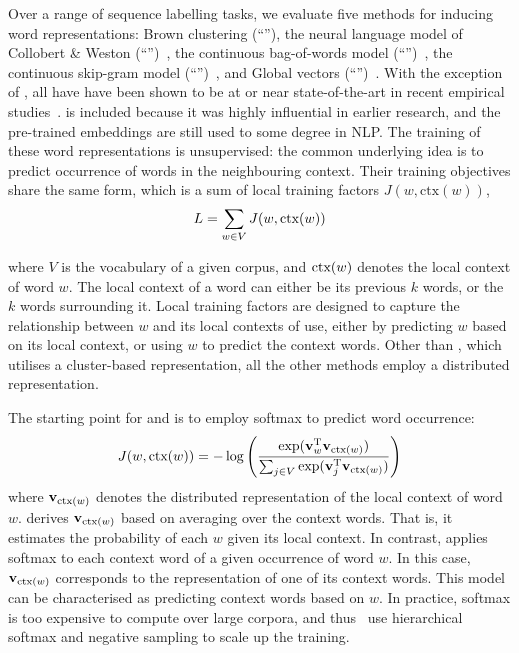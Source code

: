 Over a range of sequence labelling tasks, we evaluate five methods for
inducing word representations: Brown clustering
\cite{Brown92class-basedn-gram} (``\brown''), the neural language model
of Collobert \& Weston (``\CW'')~\cite{collobert2011natural}, the
continuous bag-of-words model (``\CBOW'')~\cite{Mikolov13}, the continuous
skip-gram model (``\Skipgram'')~\cite{Mikolov13NIPS}, and Global vectors
(``\Glove'')~\cite{pennington2014glove}. With the exception of \CW, all have
have been shown to be at or near state-of-the-art in recent empirical
studies~\cite{turian2010word,pennington2014glove}. \CW is included
because it was highly influential in earlier research, and the pre-trained embeddings are
still used to some degree in NLP. The training of these word
representations is unsupervised: the common underlying idea is to
predict occurrence of words in the neighbouring context. Their training
objectives share the same form, which is a sum of local training factors
$J(w, \text{ctx}(w))$,  
\begin{displaymath}
  L = \sum_{w \in V} J(w, \text{ctx}(w))
\end{displaymath}

where $V$ is the vocabulary of a given corpus, and $\text{ctx}(w)$ denotes the
local context of word $w$.
The local context of a word can either be its previous $k$ words, or the
$k$ words surrounding it. 
Local training factors are designed to capture the relationship between
$w$ and its local contexts of use, either by predicting $w$
based on its local context, or using $w$ to predict the
context words. Other than \brown, which utilises a cluster-based
representation, all the other methods employ a distributed representation.

The starting point for \CBOW and \Skipgram is to employ softmax to predict word occurrence:
\begin{displaymath}
  J(w, \text{ctx}(w)) = - \log \left( \frac{\exp(\mathbf{v}_w^{\text{T}} \mathbf{v}_{\text{ctx}(w)})}{ \sum_{j \in V} \exp(\mathbf{v}_j^{\text{T}} \mathbf{v}_{\text{ctx}(w)})} \right)
\end{displaymath}
where $\mathbf{v}_{\text{ctx}(w)}$ denotes the distributed representation of
the local context of word $w$. \CBOW derives $\mathbf{v}_{\text{ctx}(w)}$
based on averaging over the context words. That is, it estimates the
probability of each $w$ given its local
context. In contrast, \Skipgram applies softmax to each context word of
a given occurrence of word $w$. In this case, $\mathbf{v}_{\text{ctx}(w)}$ corresponds to the
representation of one of its context words. This model can be characterised as
predicting context words based on $w$. In practice, softmax is
too expensive to compute over large corpora, and thus~ use
hierarchical softmax and negative sampling to scale up the training.

